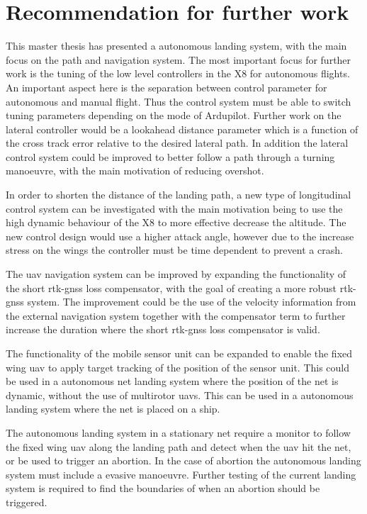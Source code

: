 \section{Recommendation for further work}
This master thesis has presented a autonomous landing system, with the main focus on the path and navigation system.
The most important focus for further work is the tuning of the low level controllers in the X8 for autonomous flights. An important aspect here is the separation between control parameter for autonomous and manual flight. Thus the control system must be able to switch tuning parameters depending on the mode of Ardupilot. Further work on the lateral controller would be a lookahead distance parameter which is a function of the cross track error relative to the desired lateral path. In addition the lateral control system could be improved to better follow a path through a turning manoeuvre, with the main motivation of reducing overshot.

In order to shorten the distance of the landing path, a new type of longitudinal control system can be investigated with the main motivation being to use the high dynamic behaviour of the X8 to more effective decrease the altitude. The new control design would use a higher attack angle, however due to the increase stress on the wings the controller must be time dependent to prevent a crash.

The \gls{uav} navigation system can be improved by expanding the functionality of the short \gls{rtk-gnss} loss compensator, with the goal of creating a more robust \gls{rtk-gnss} system. The improvement could be the use of the velocity information from the external navigation system together with the compensator term to further increase the duration where the short \gls{rtk-gnss} loss compensator is valid.

The functionality of the mobile sensor unit can be expanded to enable the fixed wing \gls{uav} to apply target tracking of the position of the sensor unit. This could be used in a autonomous net landing system where the position of the net is dynamic, without the use of multirotor \glspl{uav}. This can be used in a autonomous landing system where the net is placed on a ship.

The autonomous landing system in a stationary net require a monitor to follow the fixed wing \gls{uav} along the landing path and detect when the \gls{uav} hit the net, or be used to trigger an abortion. In the case of abortion the autonomous landing system must include a evasive manoeuvre. Further testing of the current landing system is required to find the boundaries of when an abortion should be triggered.